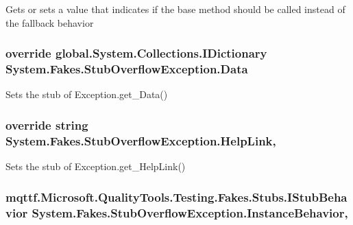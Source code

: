 Gets or sets a value that indicates if the base method should be called instead of the fallback behavior

\hypertarget{class_system_1_1_fakes_1_1_stub_overflow_exception_a101f8dc942f97cfe9d67c0cdff20dc51}{
\subsubsection[{Data}]{\setlength{\rightskip}{0pt plus 5cm}override global.\-System.\-Collections.\-I\-Dictionary System.\-Fakes.\-Stub\-Overflow\-Exception.\-Data\hspace{0.3cm}{\ttfamily [get]}}}\label{class_system_1_1_fakes_1_1_stub_overflow_exception_a101f8dc942f97cfe9d67c0cdff20dc51}


Sets the stub of Exception.\-get\-\_\-\-Data()

\hypertarget{class_system_1_1_fakes_1_1_stub_overflow_exception_a58657af30f281c300ca005aa9e07e070}{
\subsubsection[{Help\-Link}]{\setlength{\rightskip}{0pt plus 5cm}override string System.\-Fakes.\-Stub\-Overflow\-Exception.\-Help\-Link\hspace{0.3cm}{\ttfamily [get]}, {\ttfamily [set]}}}\label{class_system_1_1_fakes_1_1_stub_overflow_exception_a58657af30f281c300ca005aa9e07e070}


Sets the stub of Exception.\-get\-\_\-\-Help\-Link()

\hypertarget{class_system_1_1_fakes_1_1_stub_overflow_exception_a0bfbdac66fa7487da764e8e2a4613ce6}{
\subsubsection[{Instance\-Behavior}]{\setlength{\rightskip}{0pt plus 5cm}mqttf.\-Microsoft.\-Quality\-Tools.\-Testing.\-Fakes.\-Stubs.\-I\-Stub\-Behavior System.\-Fakes.\-Stub\-Overflow\-Exception.\-Instance\-Behavior\hspace{0.3cm}{\ttfamily [get]}, {\ttfamily [set]}}}\label{class_system_1_1_fakes_1_1_stub_overflow_exception_a0bfbdac66fa7487da764e8e2a4613ce6}


